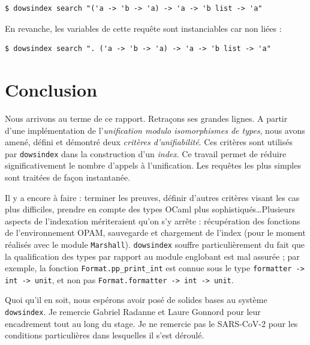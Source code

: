 \documentclass[a4paper]{report}
\theoremstyle{definition}
\newcommand{\dowsindex}{\texttt{dowsindex}\xspace}
\begin{document}
\begin{verbatim}
$ dowsindex search "('a -> 'b -> 'a) -> 'a -> 'b list -> 'a"
\end{verbatim}

En revanche, les variables de cette requête sont instanciables car non liées :

\begin{verbatim}
$ dowsindex search ". ('a -> 'b -> 'a) -> 'a -> 'b list -> 'a"
\end{verbatim}


\chapter{Conclusion}

Nous arrivons au terme de ce rapport. Retraçons ses grandes lignes. A partir d'une implémentation de l'\emph{unification modulo isomorphismes de types}, nous avons amené, défini et démontré deux \emph{critères d'unifiabilité}. Ces critères sont utilisés par \dowsindex dans la construction d'un \emph{index}. Ce travail permet de réduire significativement le nombre d'appels à l'unification. Les requêtes les plus simples sont traitées de façon instantanée.

Il y a encore à faire : terminer les preuves, définir d'autres critères visant les cas plus difficiles, prendre en compte des types OCaml plus sophistiqués\dots Plusieurs aspects de l'indexation mériteraient qu'on s'y arrête : récupération des fonctions de l'environnement OPAM, sauvegarde et chargement de l'index (pour le moment réalisés avec le module \texttt{Marshall}). \dowsindex souffre particulièrement du fait que la qualification des types par rapport au module englobant est mal assurée ; par exemple, la fonction \texttt{Format.pp_print_int} est connue sous le type \texttt{formatter -> int -> unit}, et non pas \texttt{Format.formatter -> int -> unit}.

Quoi qu'il en soit, nous espérons avoir posé de solides bases au système \dowsindex. Je remercie Gabriel Radanne et Laure Gonnord pour leur encadrement tout au long du stage. Je ne remercie pas le SARS-CoV-2 pour les conditions particulières dans lesquelles il s'est déroulé.

\end{document}
